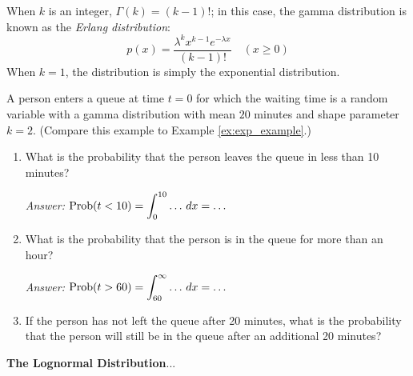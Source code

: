 When $k$ is an integer, $\Gamma(k) = (k-1)!$; in this case,
the gamma distribution is known as the \emph{Erlang distribution}:
\begin{equation}
  p(x) = \frac{\lambda^{k} x^{k-1} e^{-\lambda x}}{(k-1)!}
   \quad (x \ge 0)
\end{equation}
When $k=1$, the distribution is simply the exponential distribution.
%
\begin{xexample}
A person enters a queue at time $t=0$ for which the
waiting time is a random variable with a gamma distribution
with mean $20$ minutes and shape parameter $k=2$.
(Compare this example to Example \ref{ex:exp_example}.)
\begin{enumerate}
\item What is the probability that the person leaves the
queue in less than 10 minutes?

\noindent
\emph{Answer:} $\displaystyle \textrm{Prob}(t < 10) = \int_0^{10} \ldots \,dx
     = \ldots$
\item What is the probability that the person is in the queue for
more than an hour?

\noindent
\emph{Answer:}
 $\displaystyle \textrm{Prob}(t > 60) = \int_{60}^{\infty} \ldots \,dx
     = \ldots$

\item If the person has not left the queue after 20 minutes, what is the
probability that the person will still be in the queue after an additional
20 minutes?
\end{enumerate}
\end{xexample}

\noindent
\textbf{The Lognormal Distribution}...
